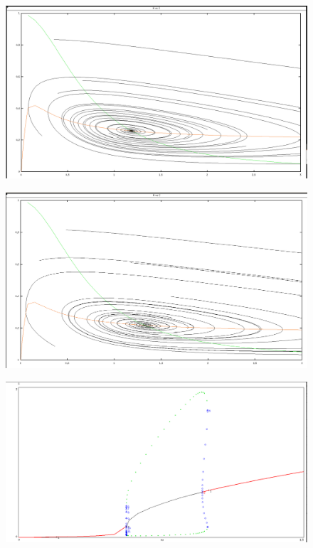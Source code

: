 \documentclass[a4paper,12pt,notitlepage]{article}
\begin{document}
\begin{figure}[h]
    \centering
        \centering
        \includegraphics[width=\textwidth]{mu13.png} 
\end{figure}

\begin{figure}[h]
        \centering
        \includegraphics[width=\textwidth]{mu15.png} 
\end{figure}

\begin{figure}[h]
    \centering
        \centering
        \includegraphics[width=\textwidth]{mubif.png} 
\end{figure}
\end{document}
